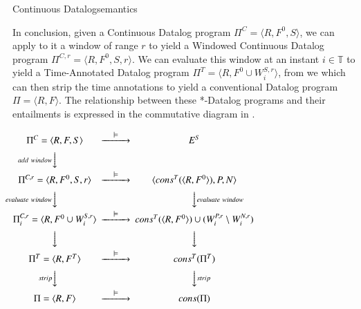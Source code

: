 \begin{nestedsection}{Continuous Datalog}{semantics}



In conclusion, given a Continuous Datalog program $\Pi^C = \langle R,
F^0, S \rangle$, we can apply to it a window of range $r$ to yield a
Windowed Continuous Datalog program $\Pi^{C,r} = \langle R, F^0, S, r
\rangle$. We can evaluate this window at an instant $i \in \mathbb{T}$
to yield a Time-Annotated Datalog program $\Pi^T = \langle R, F^0 \cup
W^{S,r}_i \rangle$, from we which can then strip the time annotations
to yield a conventional Datalog program $\Pi = \langle R, F
\rangle$. The relationship between these *-Datalog programs and their
entailments is expressed in the commutative diagram in
.

\begin{figure*}
\centering
$
\begin{CD}
	{\Pi^C = \langle R, F, S \rangle} @>\models>> {E^S} \\
	@V{add\ window}VV \\
        {\Pi^{C,r} = \langle R, F^0, S, r \rangle} @>\models>> {\langle cons^T(\langle R, F^0\rangle), P, N \rangle} \\
        @V{evaluate\ window}VV @VV{evaluate\ window}V \\
        {\Pi^{C,r}_i = \langle R, F^0 \cup W^{S,r}_i \rangle} @>\models>> {cons^T(\langle R, F^0 \rangle) \cup (W^{P,r}_i \setminus W^{N,r}_i)} \\
	@VVV @VVV \\
        {\Pi^T = \langle R, F^T \rangle } @>\models>> {cons^T(\Pi^T)} \\
	@V{strip}VV @VV{strip}V \\
        {\Pi = \langle R, F \rangle } @>\models>> {cons(\Pi)}
\end{CD}
$
\caption{Commutative diagram from Continuous Datalog programs to Datalog entailments.}
\end{figure*}
\end{nestedsection}
